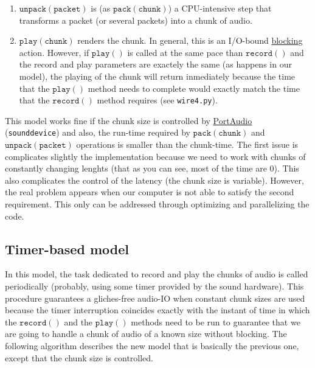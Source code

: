\begin{enumerate}
\item $\mathtt{unpack(packet)}$ is (as $\mathtt{pack(chunk)}$) a
  CPU-intensive step that transforms a packet (or several packets)
  into a chunk of audio.

\item $\mathtt{play(chunk)}$ renders the chunk. In general, this is an
  I/O-bound
  \href{https://python-sounddevice.readthedocs.io/en/0.4.0/api/streams.html#sounddevice.Stream.write}{blocking}
  action. However, if $\mathtt{play()}$ is called at the same pace
  than $\mathtt{record()}$ and the record and play parameters are
  exactely the same (as happens in our model), the playing of the
  chunk will return inmediately because the time that the
  $\mathtt{play()}$ method needs to complete would exactly match the
  time that the $\mathtt{record()}$ method requires (see
  \texttt{wire4.py}).
\end{enumerate}

This model works fine if the chunk size is controlled by
\href{http://www.portaudio.com/}{PortAudio}~\cite{portaudio}
(\texttt{sounddevice}) and also, the run-time required by
$\mathtt{pack(chunk)}$ and $\mathtt{unpack(packet)}$ operations is
smaller than the chunk-time. The first issue is complicates slightly
the implementation because we need to work with chunks of constantly
changing lenghts (that as you can see, most of the time are 0). This
also complicates the control of the latency (the chunk size is
variable). However, the real problem appears when our computer is not
able to satisfy the second requirement. This only can be addressed
through optimizing and parallelizing the code.

\subsection{Timer-based model}

In this model, the task dedicated to record and play the chunks of
audio is called periodically (probably, using some timer provided by
the sound hardware). This procedure guarantees a gliches-free audio-IO
when constant chunk sizes are used because the timer interruption
coincides exactly with the instant of time in which the
$\mathtt{record()}$ and the $\mathtt{play()}$ methods need to be run
to guarantee that we are going to handle a chunk of audio of a known
size without blocking. The following algorithm describes the new model
that is basically the previous one, except that the chunk size is
controlled.

